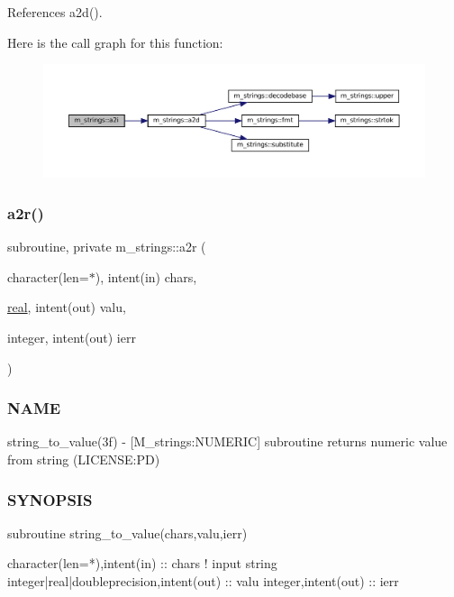 References a2d().

Here is the call graph for this function\+:\nopagebreak
\begin{figure}[H]
\begin{center}
\leavevmode
\includegraphics[width=350pt]{namespacem__strings_aca902af295ede82fb0c45174bbfe6eef_cgraph}
\end{center}
\end{figure}
\mbox{\label{namespacem__strings_a6b4babf586dc3586426b13e4bb0fb979}} 
\subsubsection{\texorpdfstring{a2r()}{a2r()}}
{\footnotesize\ttfamily subroutine, private m\+\_\+strings\+::a2r (\begin{DoxyParamCaption}\item[{character(len=$\ast$), intent(in)}]{chars,  }\item[{\mbox{\hyperlink{interfacem__strings_1_1real}{real}}, intent(out)}]{valu,  }\item[{integer, intent(out)}]{ierr }\end{DoxyParamCaption})\hspace{0.3cm}{\ttfamily [private]}}



\subsubsection*{N\+A\+ME}

string\+\_\+to\+\_\+value(3f) -\/ \mbox{[}M\+\_\+strings\+:N\+U\+M\+E\+R\+IC\mbox{]} subroutine returns numeric value from string (L\+I\+C\+E\+N\+SE\+:PD) 

\subsubsection*{S\+Y\+N\+O\+P\+S\+IS}

\begin{DoxyVerb}subroutine string_to_value(chars,valu,ierr)

 character(len=*),intent(in)              :: chars   ! input string
 integer|real|doubleprecision,intent(out) :: valu
 integer,intent(out)                      :: ierr
\end{DoxyVerb}
